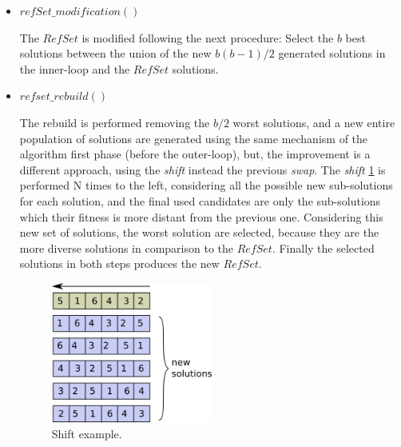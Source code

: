 \begin{itemize}
    \item $refSet\_modification()$

        The $RefSet$ is modified following the next procedure:
        Select the $b$ best solutions between the union of the new
        $b(b-1)/2$ generated solutions in the inner-loop and the $RefSet$ solutions.

    \item $refset\_rebuild()$

        The rebuild is performed removing the $b/2$ worst solutions,
        and a new entire population of solutions are generated
        using the same mechanism of the algorithm first phase (before the outer-loop),
        but, the improvement is a different approach, using the \emph{shift} instead
        the previous \emph{swap}.
        The \emph{shift} \ref{fig:shift} is performed N times to the left,
        considering all the possible new sub-solutions for each solution,
        and the final used candidates are only the sub-solutions which their fitness
        is more distant from the previous one.
        Considering this new set of solutions, the worst solution are selected,
        because they are the more diverse solutions in comparison to the $RefSet$.
        Finally the selected solutions in both steps produces the new $RefSet$.

        \begin{figure}[h!t]
            \centering
            \includegraphics[width=0.5\textwidth]{img/ia-shift}
            \caption{Shift example.}
            \label{fig:shift}
        \end{figure}
\end{itemize}
